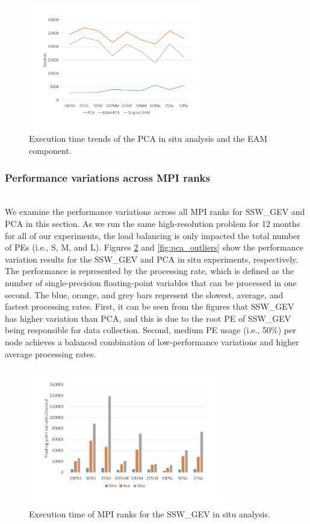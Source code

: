 \documentclass{juliacon}
\begin{document}
\begin{figure}
    \centering
    \includegraphics[width=\linewidth, height=5.5cm]{figures/pca_trend.pdf}
    \caption{Execution time trends of the PCA in situ analysis and the EAM component.}
    \label{fig:pca_trend}
\end{figure}


\subsubsection{Performance variations across MPI ranks}\hspace*{\fill} \\

We examine the performance variations across all MPI ranks for SSW\_GEV and PCA in this section. As we run the same high-resolution problem for 12 months for all of our experiments, the load balancing is only impacted the total number of PEs (i.e., S, M, and L). Figures \ref{fig:ssw_outliers} and \ref{fig:pca_outliers} show the performance variation results for the SSW\_GEV and PCA in situ experiments, respectively. The performance is represented by the processing rate, which is defined as the number of single-precision floating-point variables that can be processed in one second. The blue, orange, and grey bars represent the slowest, average, and fastest processing rates. First, it can be seen from the figures that SSW\_GEV has higher variation than PCA, and this is due to the root PE of SSW\_GEV being responsible for data collection. Second, medium PE usage (i.e., 50\%) per node achieves a balanced combination of low-performance variations and higher average processing rates. 

\begin{figure}
    \centering
    \includegraphics[width=\linewidth, height=6cm]{figures/ssw_outliers.pdf}
    \caption{Execution time of MPI ranks for the SSW\_GEV in situ analysis.}
    \label{fig:ssw_outliers}
\end{figure}
\end{document}
